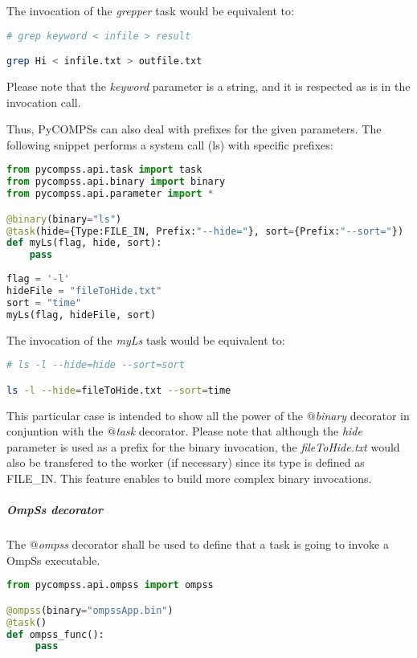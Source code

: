 The invocation of the {\it grepper} task would be equivalent to:

\begin{lstlisting}[language=bash]
# grep keyword < infile > result

grep Hi < infile.txt > outfile.txt
\end{lstlisting}

Please note that the {\it keyword} parameter is a string, and it is respected as is in the invocation call.

Thus, PyCOMPSs can also deal with prefixes for the given parameters. 
The following snippet performs a system call (ls) with specific prefixes:

\begin{lstlisting}[language=python]
from pycompss.api.task import task
from pycompss.api.binary import binary
from pycompss.api.parameter import *

@binary(binary="ls")
@task(hide={Type:FILE_IN, Prefix:"--hide="}, sort={Prefix:"--sort="})
def myLs(flag, hide, sort):
    pass
    
flag = '-l'
hideFile = "fileToHide.txt"
sort = "time"
myLs(flag, hideFile, sort)
\end{lstlisting}

The invocation of the {\it myLs} task would be equivalent to:

\begin{lstlisting}[language=bash]
# ls -l --hide=hide --sort=sort

ls -l --hide=fileToHide.txt --sort=time
\end{lstlisting}

This particular case is intended to show all the power of the {\it $@$binary} decorator in conjuntion with the
{\it $@$task} decorator. Please note that although the {\it hide} parameter is used as a prefix for the binary invocation,
the {\it fileToHide.txt} would also be transfered to the worker (if necessary) since its type is defined as FILE\_IN. 
This feature enables to build more complex binary invocations.

\subparagraph{OmpSs decorator}
\label{subpar:ompss_decorator}

The {\it $@$ompss} decorator shall be used to define that a task is going to invoke a OmpSs executable.

\begin{lstlisting}[language=python]
from pycompss.api.ompss import ompss

@ompss(binary="ompssApp.bin")
@task()
def ompss_func():
     pass
\end{lstlisting}

